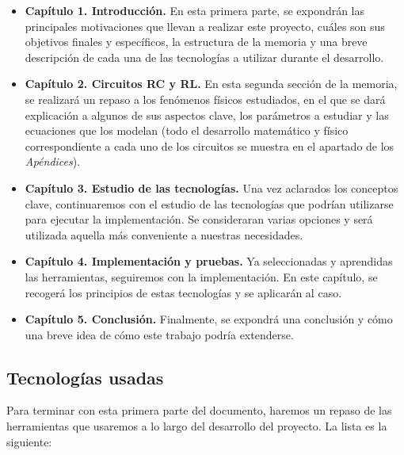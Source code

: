 \documentclass[../main.tex]{subfiles}
\begin{document}
\begin{itemize}
    \item \textbf{Capítulo 1. Introducción. } En esta primera parte, se expondrán las principales motivaciones que llevan a realizar este proyecto, cuáles son sus objetivos finales y específicos, la estructura de la memoria y una breve descripción de cada una de las tecnologías a utilizar durante  el desarrollo.
    \item \textbf{Capítulo 2. Circuitos RC y RL. } En esta segunda sección de la memoria, se realizará un repaso a los fenómenos físicos estudiados, en el que se dará explicación a algunos de sus aspectos clave, los parámetros a estudiar y las ecuaciones que los modelan (todo el desarrollo matemático y físico correspondiente a cada uno de los circuitos se muestra en el apartado de los \textit{Apéndices}).
    \item \textbf{Capítulo 3. Estudio de las tecnologías.} Una vez aclarados los conceptos clave, continuaremos con el estudio de las tecnologías que podrían utilizarse para ejecutar la implementación. Se consideraran varias opciones y será utilizada aquella más conveniente a nuestras necesidades.
    \item \textbf{Capítulo 4. Implementación y pruebas.} Ya seleccionadas y aprendidas las herramientas, seguiremos con la implementación. En este capítulo, se recogerá los principios de estas tecnologías y se aplicarán al caso.
    \item \textbf{Capítulo 5. Conclusión. }Finalmente, se expondrá una conclusión y cómo una breve idea de cómo este trabajo podría extenderse. 
\end{itemize}

\subsection{Tecnologías usadas}
Para terminar con esta primera parte del documento, haremos un repaso de las herramientas que usaremos a lo largo del desarrollo del proyecto. La lista es la siguiente:
\end{document}
